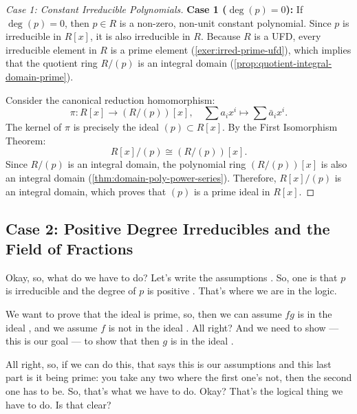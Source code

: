 \begin{proofWrapper}
\begin{content}
\begin{proof}[Case 1: Constant Irreducible Polynomials]
\textbf{Case 1 ($\deg(p) = 0$):}
If $\deg(p) = 0$, then $p \in R$ is a non-zero, non-unit constant polynomial. Since $p$ is irreducible in $R[x]$, it is also irreducible in $R$. Because $R$ is a UFD, every irreducible element in $R$ is a prime element (\cref{exer:irred-prime-ufd}), which implies that the quotient ring $R/(p)$ is an integral domain (\cref{prop:quotient-integral-domain-prime}).

Consider the canonical reduction homomorphism:
\[
\pi \colon R[x] \to (R/(p))[x], \quad \sum a_i x^i \mapsto \sum \bar{a}_i x^i.
\]
The kernel of $\pi$ is precisely the ideal $(p) \subset R[x]$. By the First Isomorphism Theorem:
\[
R[x]/(p) \cong (R/(p))[x].
\]
Since $R/(p)$ is an integral domain, the polynomial ring $(R/(p))[x]$ is also an integral domain (\cref{thm:domain-poly-power-series}). Therefore, $R[x]/(p)$ is an integral domain, which proves that $(p)$ is a prime ideal in $R[x]$.
\end{proof}
\end{content}

\subsection{Case 2: Positive Degree Irreducibles and the Field of Fractions}

\begin{speech}[00:15:33 - 00:16:44]
Okay, so, what do we have to do? Let's write the assumptions . So, one is that $p$ is irreducible and the degree of $p$ is positive . That's where we are in the logic.

We want to prove that the ideal is prime, so, then we can assume $fg$ is in the ideal , and we assume $f$ is not in the ideal . All right? And we need to show --- this is our goal --- to show that then $g$ is in the ideal .

All right, so, if we can do this, that says this is our assumptions and this last part is it being prime: you take any two where the first one's not, then the second one has to be. So, that's what we have to do. Okay? That's the logical thing we have to do. Is that clear?
\end{speech}


\end{proofWrapper}
